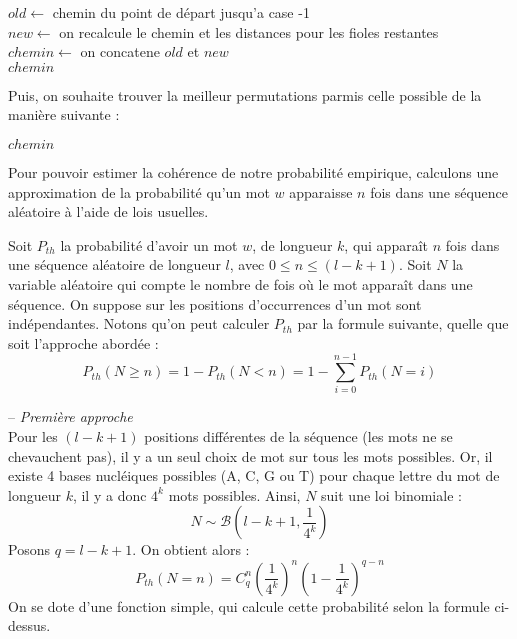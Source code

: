 \documentclass[11pt]{article}
\begin{document}
\SetAlgoVlined
\begin{algorithm}
    $old \leftarrow $ chemin du point de départ jusqu'a case -1  \\
    $new \leftarrow $ on recalcule le chemin et les distances pour les fioles restantes \\
    $chemin \leftarrow $ on concatene $old$ et $new$  \\
    \Retour $chemin$
\end{algorithm}

Puis, on souhaite trouver la meilleur permutations parmis celle possible de la manière suivante :

\newpage

\SetAlgoVlined
\begin{algorithm}
    \Retour $chemin$
\end{algorithm}


Pour pouvoir estimer la cohérence de notre probabilité empirique, calculons une approximation de la probabilité qu'un mot $w$ apparaisse $n$ fois dans une séquence aléatoire à l'aide de lois usuelles.

Soit $P_{th}$ la probabilité d'avoir un mot $w$, de longueur $k$, qui apparaît $n$ fois dans une séquence aléatoire de longueur $l$, avec $0 \leq n \leq (l - k + 1)$. Soit $N$ la variable aléatoire qui compte le nombre de fois où le mot apparaît dans une séquence. On suppose sur les positions d'occurrences d'un mot sont indépendantes. Notons qu'on peut calculer $P_{th}$ par la formule suivante, quelle que soit l'approche abordée : 
 \[ P_{th}(N \geq n) = 1 - P_{th}(N < n) = 1 - \sum_{i = 0}^{n-1} P_{th}(N = i) \]

-- {\itshape Première approche} \\
Pour les $(l - k + 1)$ positions différentes de la séquence (les mots ne se chevauchent pas), il y a un seul choix de mot sur tous les mots possibles. Or, il existe 4 bases nucléiques possibles ({\ttfamily A, C, G} ou {\ttfamily T}) pour chaque lettre du mot de longueur $k$,  il y a donc $4^k$ mots possibles. Ainsi, $N$ suit une loi binomiale : \[N \sim \mathcal{B}(l - k + 1, \frac{1}{4^k})\]
Posons $q = l - k + 1$. On obtient alors : \[P_{th}(N = n) = C^{n}_q \left(\frac{1}{4^k}\right)^n \left(1 - \frac{1}{4^k}\right)^{q - n}\]
On se dote d'une fonction simple, qui calcule cette probabilité selon la formule ci-dessus.
\end{document}
